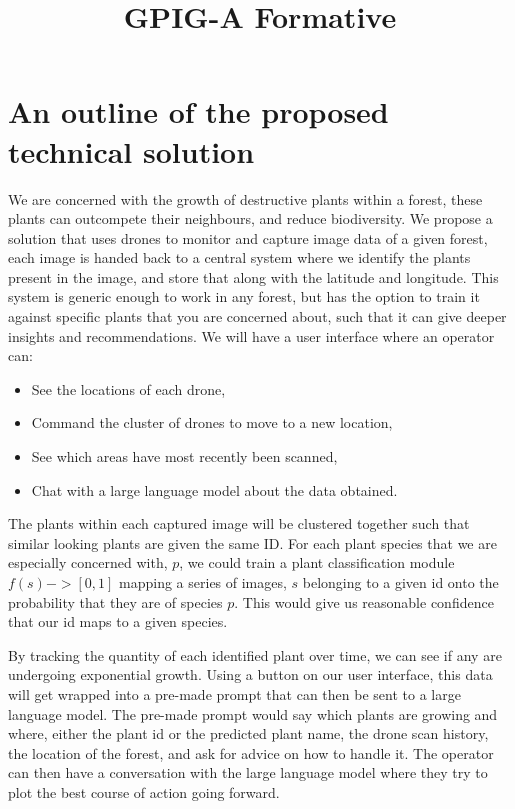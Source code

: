 \documentclass{article}
\title{GPIG-A Formative}
\begin{document}
\maketitle

\section{An outline of the proposed technical solution}

We are concerned with the growth of destructive plants within a forest, these plants can outcompete their neighbours, and reduce biodiversity. 
We propose a solution that uses drones to monitor and capture image data of a given forest, each image is handed back to a central system where we identify the plants present in the image, and store that along with the latitude and longitude. 
This system is generic enough to work in any forest, but has the option to train it against specific plants that you are concerned about, such that it can give deeper insights and recommendations.
We will have a user interface where an operator can:
\begin{itemize}[noitemsep,topsep=3pt]
\item See the locations of each drone,
\item Command the cluster of drones to move to a new location,
\item See which areas have most recently been scanned,
\item Chat with a large language model about the data obtained.
\end{itemize}


The plants within each captured image will be clustered together such that similar looking plants are given the same ID. 
For each plant species that we are especially concerned with, $p$, we could train a plant classification module $f(s) -> [0,1]$ mapping a series of images, $s$ belonging to a given id onto the probability that they are of species $p$. 
This would give us reasonable confidence that our id maps to a given species.

By tracking the quantity of each identified plant over time, we can see if any are undergoing exponential growth.
Using a button on our user interface, this data will get wrapped into a pre-made prompt that can then be sent to a large language model.
The pre-made prompt would say which plants are growing and where, either the plant id or the predicted plant name, the drone scan history, the location of the forest, and ask for advice on how to handle it.
The operator can then have a conversation with the large language model where they try to plot the best course of action going forward.
\end{document}
